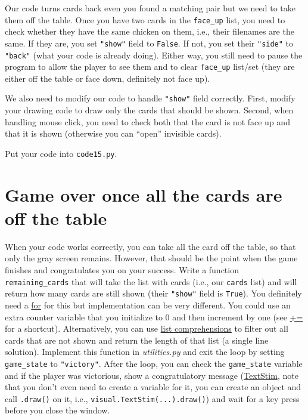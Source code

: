 \documentclass[
]{book}
\begin{document}
Our code turns cards back even you found a matching pair but we need to take them off the table. Once you have two cards in the \texttt{face\_up} list, you need to check whether they have the same chicken on them, i.e., their filenames are the same. If they are, you set \texttt{"show"} field to \texttt{False}. If not, you set their \texttt{"side"} to \texttt{"back"} (what your code is already doing). Either way, you still need to pause the program to allow the player to see them and to clear \texttt{face\_up} list/set (they are either off the table or face down, definitely not face up).

We also need to modify our code to handle \texttt{"show"} field correctly. First, modify your drawing code to draw only the cards that should be shown. Second, when handling mouse click, you need to check both that the card is not face up and that it is shown (otherwise you can ``open'' invisible cards).

Put your code into \texttt{code15.py}.

\hypertarget{game-over-once-all-the-cards-are-off-the-table}{%
\section{Game over once all the cards are off the table}\label{game-over-once-all-the-cards-are-off-the-table}}

When your code works correctly, you can take all the card off the table, so that only the gray screen remains. However, that should be the point when the game finishes and congratulates you on your success. Write a function \texttt{remaining\_cards} that will take the list with cards (i.e., our \texttt{cards} list) and will return how many cards are still shown (their \texttt{"show"} field is \texttt{True}). You definitely need a \protect\hyperlink{for-loop}{for} for this but implementation can be very different. You could use an extra counter variable that you initialize to 0 and then increment by one (see \href{https://docs.python.org/3/reference/simple_stmts.html\#augmented-assignment-statements}{+=} for a shortcut). Alternatively, you can use \href{l\#list-comprehension}{list comprehensions} to filter out all cards that are not shown and return the length of that list (a single line solution). Implement this function in \emph{utilities.py} and exit the loop by setting \texttt{game\_state} to \texttt{"victory"}. After the loop, you can check the \texttt{game\_state} variable and if the player was victorious, show a congratulatory message (\href{https://psychopy.org/api/visual/textstim.html\#psychopy.visual.TextStim}{TextStim}, note that you don't even need to create a variable for it, you can create an object and call \texttt{.draw()} on it, i.e., \texttt{visual.TextStim(...).draw()}) and wait for a key press before you close the window.
\end{document}
